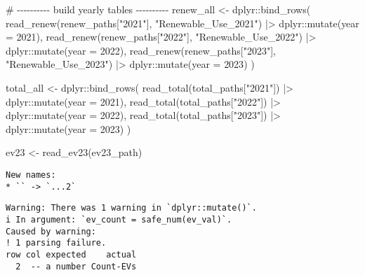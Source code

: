\documentclass[
  english,
  letterpaper,
  DIV=11,
  numbers=noendperiod]{scrartcl}
\newenvironment{Shaded}{\begin{snugshade}}{\end{snugshade}}
\newcommand{\AttributeTok}[1]{\textcolor[rgb]{0.40,0.45,0.13}{#1}}
\newcommand{\CommentTok}[1]{\textcolor[rgb]{0.37,0.37,0.37}{#1}}
\newcommand{\DecValTok}[1]{\textcolor[rgb]{0.68,0.00,0.00}{#1}}
\newcommand{\FunctionTok}[1]{\textcolor[rgb]{0.28,0.35,0.67}{#1}}
\newcommand{\NormalTok}[1]{\textcolor[rgb]{0.00,0.23,0.31}{#1}}
\newcommand{\OtherTok}[1]{\textcolor[rgb]{0.00,0.23,0.31}{#1}}
\newcommand{\SpecialCharTok}[1]{\textcolor[rgb]{0.37,0.37,0.37}{#1}}
\newcommand{\StringTok}[1]{\textcolor[rgb]{0.13,0.47,0.30}{#1}}
\begin{document}
\begin{Shaded}
\begin{Highlighting}[]
\CommentTok{\# {-}{-}{-}{-}{-}{-}{-}{-}{-}{-} build yearly tables {-}{-}{-}{-}{-}{-}{-}{-}{-}{-}}
\NormalTok{renew\_all }\OtherTok{\textless{}{-}}\NormalTok{ dplyr}\SpecialCharTok{::}\FunctionTok{bind\_rows}\NormalTok{(}
  \FunctionTok{read\_renew}\NormalTok{(renew\_paths[}\StringTok{"2021"}\NormalTok{], }\StringTok{"Renewable\_Use\_2021"}\NormalTok{) }\SpecialCharTok{|\textgreater{}}\NormalTok{ dplyr}\SpecialCharTok{::}\FunctionTok{mutate}\NormalTok{(}\AttributeTok{year =} \DecValTok{2021}\NormalTok{),}
  \FunctionTok{read\_renew}\NormalTok{(renew\_paths[}\StringTok{"2022"}\NormalTok{], }\StringTok{"Renewable\_Use\_2022"}\NormalTok{) }\SpecialCharTok{|\textgreater{}}\NormalTok{ dplyr}\SpecialCharTok{::}\FunctionTok{mutate}\NormalTok{(}\AttributeTok{year =} \DecValTok{2022}\NormalTok{),}
  \FunctionTok{read\_renew}\NormalTok{(renew\_paths[}\StringTok{"2023"}\NormalTok{], }\StringTok{"Renewable\_Use\_2023"}\NormalTok{) }\SpecialCharTok{|\textgreater{}}\NormalTok{ dplyr}\SpecialCharTok{::}\FunctionTok{mutate}\NormalTok{(}\AttributeTok{year =} \DecValTok{2023}\NormalTok{)}
\NormalTok{)}

\NormalTok{total\_all }\OtherTok{\textless{}{-}}\NormalTok{ dplyr}\SpecialCharTok{::}\FunctionTok{bind\_rows}\NormalTok{(}
  \FunctionTok{read\_total}\NormalTok{(total\_paths[}\StringTok{"2021"}\NormalTok{]) }\SpecialCharTok{|\textgreater{}}\NormalTok{ dplyr}\SpecialCharTok{::}\FunctionTok{mutate}\NormalTok{(}\AttributeTok{year =} \DecValTok{2021}\NormalTok{),}
  \FunctionTok{read\_total}\NormalTok{(total\_paths[}\StringTok{"2022"}\NormalTok{]) }\SpecialCharTok{|\textgreater{}}\NormalTok{ dplyr}\SpecialCharTok{::}\FunctionTok{mutate}\NormalTok{(}\AttributeTok{year =} \DecValTok{2022}\NormalTok{),}
  \FunctionTok{read\_total}\NormalTok{(total\_paths[}\StringTok{"2023"}\NormalTok{]) }\SpecialCharTok{|\textgreater{}}\NormalTok{ dplyr}\SpecialCharTok{::}\FunctionTok{mutate}\NormalTok{(}\AttributeTok{year =} \DecValTok{2023}\NormalTok{)}
\NormalTok{)}

\NormalTok{ev23 }\OtherTok{\textless{}{-}} \FunctionTok{read\_ev23}\NormalTok{(ev23\_path)}
\end{Highlighting}
\end{Shaded}

\begin{verbatim}
New names:
* `` -> `...2`
\end{verbatim}

\begin{verbatim}
Warning: There was 1 warning in `dplyr::mutate()`.
i In argument: `ev_count = safe_num(ev_val)`.
Caused by warning:
! 1 parsing failure.
row col expected    actual
  2  -- a number Count-EVs
\end{verbatim}
\end{document}
